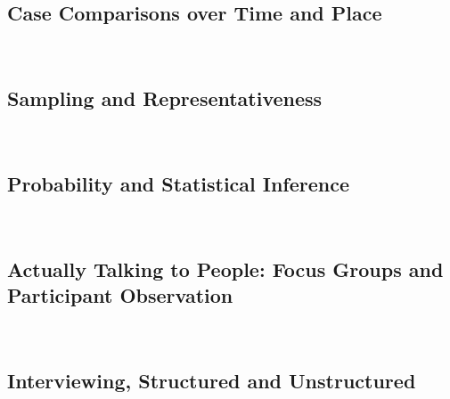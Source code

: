 \documentclass[12pt,a4paper]{article}
\newcommand{\lecture}[3][\DefaultOpt]{%
  \def\DefaultOpt{#2}%
  \clearpage\subsection[#1]{#2}\emph{#3}\vspace{.25em}\\
}
\begin{document}
\lecture{Case Comparisons over Time and Place}{}



\lecture{Sampling and Representativeness}{}

\lecture{Probability and Statistical Inference}{}

\lecture{Actually Talking to People: Focus Groups and Participant Observation}{}


\lecture{Interviewing, Structured and Unstructured}{}
\end{document}
